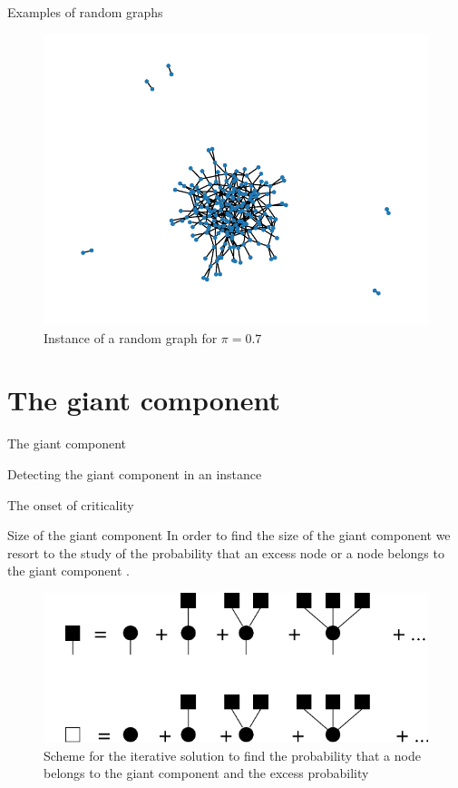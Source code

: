 \documentclass[handout]{beamer}
\begin{document}
\begin{frame}{Examples of random graphs}
    \begin{figure}
        \centering
        \includegraphics[height=.7\textheight]{rg2}
        \caption{Instance of a random graph for $\pi=0.7$}
        \label{fig:rg2}
    \end{figure}
\end{frame}

\section{The giant component}

\begin{frame}{The giant component}
\end{frame}

\begin{frame}{Detecting the giant component in an instance}
\end{frame}

\begin{frame}{The onset of criticality}
\end{frame}

\begin{frame}{Size of the giant component}
    In order to find the size of the giant component we resort to the study of
    the probability that an excess node or a node belongs to the giant
    component \cite[56]{weigt}.

    \begin{figure}
        \centering
        \includegraphics[width=.6\textwidth]{PTCOP_iterative}
        \caption{Scheme for the iterative solution to find the probability that
        a node belongs to the giant component and the excess probability}
        \label{fig:iterative}
    \end{figure}
\end{frame}
\end{document}
